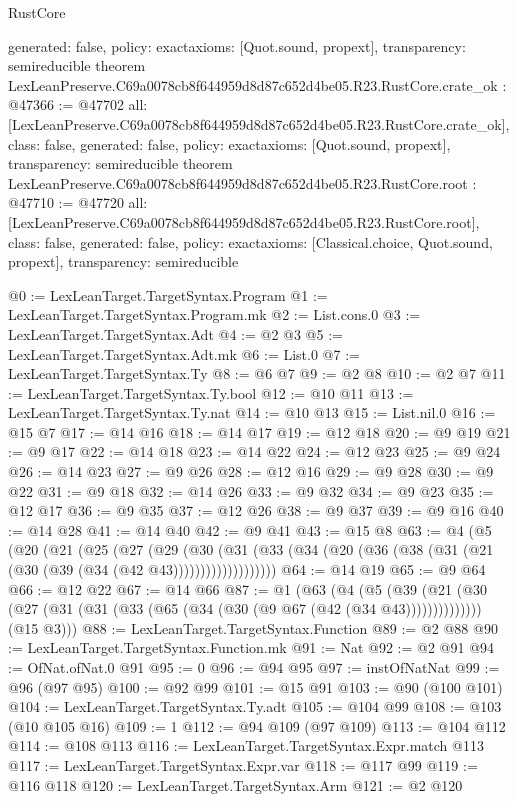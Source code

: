\begin{lexlean}{RustCore}
\begin{coremodule}
{  generated: false,
  policy: exact{axioms: [Quot.sound, propext]},
  transparency: semireducible
}
theorem LexLeanPreserve.C69a0078cb8f644959d8d87c652d4be05.R23.RustCore.crate_ok : @47366 := @47702 {
  all: [LexLeanPreserve.C69a0078cb8f644959d8d87c652d4be05.R23.RustCore.crate_ok],
  class: false,
  generated: false,
  policy: exact{axioms: [Quot.sound, propext]},
  transparency: semireducible
}
theorem LexLeanPreserve.C69a0078cb8f644959d8d87c652d4be05.R23.RustCore.root : @47710 := @47720 {
  all: [LexLeanPreserve.C69a0078cb8f644959d8d87c652d4be05.R23.RustCore.root],
  class: false,
  generated: false,
  policy: exact{axioms: [Classical.choice, Quot.sound, propext]},
  transparency: semireducible
}

@0 := LexLeanTarget.TargetSyntax.Program
@1 := LexLeanTarget.TargetSyntax.Program.mk
@2 := List.cons.{0}
@3 := LexLeanTarget.TargetSyntax.Adt
@4 := @2 @3
@5 := LexLeanTarget.TargetSyntax.Adt.mk
@6 := List.{0}
@7 := LexLeanTarget.TargetSyntax.Ty
@8 := @6 @7
@9 := @2 @8
@10 := @2 @7
@11 := LexLeanTarget.TargetSyntax.Ty.bool
@12 := @10 @11
@13 := LexLeanTarget.TargetSyntax.Ty.nat
@14 := @10 @13
@15 := List.nil.{0}
@16 := @15 @7
@17 := @14 @16
@18 := @14 @17
@19 := @12 @18
@20 := @9 @19
@21 := @9 @17
@22 := @14 @18
@23 := @14 @22
@24 := @12 @23
@25 := @9 @24
@26 := @14 @23
@27 := @9 @26
@28 := @12 @16
@29 := @9 @28
@30 := @9 @22
@31 := @9 @18
@32 := @14 @26
@33 := @9 @32
@34 := @9 @23
@35 := @12 @17
@36 := @9 @35
@37 := @12 @26
@38 := @9 @37
@39 := @9 @16
@40 := @14 @28
@41 := @14 @40
@42 := @9 @41
@43 := @15 @8
@63 := @4
    (@5
      (@20
        (@21
          (@25
            (@27
              (@29
                (@30
                  (@31 (@33 (@34 (@20 (@36 (@38 (@31 (@21 (@30 (@39 (@34 (@42 @43)))))))))))))))))))
@64 := @14 @19
@65 := @9 @64
@66 := @12 @22
@67 := @14 @66
@87 := @1
    (@63
      (@4
        (@5 (@39 (@21 (@30 (@27 (@31 (@31 (@33 (@65 (@34 (@30 (@9 @67 (@42 (@34 @43))))))))))))))
        (@15 @3)))
@88 := LexLeanTarget.TargetSyntax.Function
@89 := @2 @88
@90 := LexLeanTarget.TargetSyntax.Function.mk
@91 := Nat
@92 := @2 @91
@94 := OfNat.ofNat.{0} @91
@95 := 0
@96 := @94 @95
@97 := instOfNatNat
@99 := @96 (@97 @95)
@100 := @92 @99
@101 := @15 @91
@103 := @90 (@100 @101)
@104 := LexLeanTarget.TargetSyntax.Ty.adt
@105 := @104 @99
@108 := @103 (@10 @105 @16)
@109 := 1
@112 := @94 @109 (@97 @109)
@113 := @104 @112
@114 := @108 @113
@116 := LexLeanTarget.TargetSyntax.Expr.match @113
@117 := LexLeanTarget.TargetSyntax.Expr.var
@118 := @117 @99
@119 := @116 @118
@120 := LexLeanTarget.TargetSyntax.Arm
@121 := @2 @120

\end{coremodule}
\end{lexlean}
